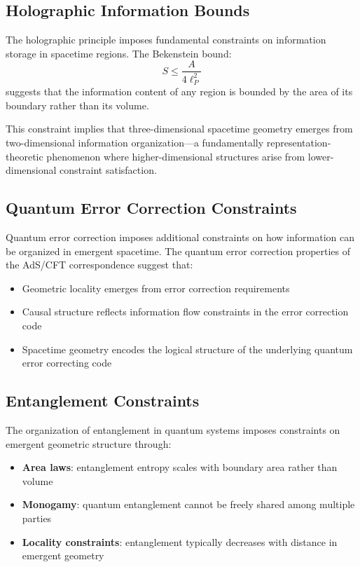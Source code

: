 \documentclass[12pt]{article}
\begin{document}
\subsection{Holographic Information Bounds}

The holographic principle imposes fundamental constraints on information storage in spacetime regions. The Bekenstein bound:
\begin{equation}
S \leq \frac{A}{4\ell_P^2}
\end{equation}
suggests that the information content of any region is bounded by the area of its boundary rather than its volume.

This constraint implies that three-dimensional spacetime geometry emerges from two-dimensional information organization—a fundamentally representation-theoretic phenomenon where higher-dimensional structures arise from lower-dimensional constraint satisfaction.

\subsection{Quantum Error Correction Constraints}

Quantum error correction imposes additional constraints on how information can be organized in emergent spacetime. The quantum error correction properties of the AdS/CFT correspondence suggest that:

\begin{itemize}
\item Geometric locality emerges from error correction requirements
\item Causal structure reflects information flow constraints in the error correction code
\item Spacetime geometry encodes the logical structure of the underlying quantum error correcting code
\end{itemize}

\subsection{Entanglement Constraints}

The organization of entanglement in quantum systems imposes constraints on emergent geometric structure through:

\begin{itemize}
\item \textbf{Area laws}: entanglement entropy scales with boundary area rather than volume
\item \textbf{Monogamy}: quantum entanglement cannot be freely shared among multiple parties
\item \textbf{Locality constraints}: entanglement typically decreases with distance in emergent geometry
\end{itemize}
\end{document}
